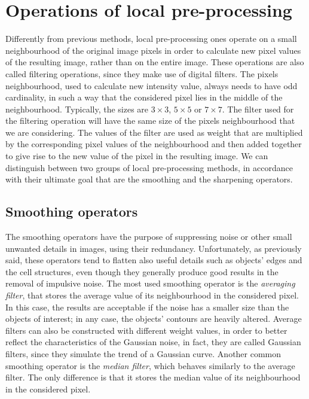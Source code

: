 \documentclass[final,a4paper,12pt,english]{UnicaPhdThesis3}
\begin{document}
	\section{Operations of local pre-processing} %
	Differently from previous methods, local pre-processing ones operate on a small neighbourhood of the original image pixels in order to calculate new pixel values ​​of the resulting image, rather than on the entire image. These operations are also called filtering operations, since they make use of digital filters. The pixels neighbourhood, used to calculate new intensity value, always needs to have odd cardinality, in such a way that the considered pixel lies in the middle of the neighbourhood. Typically, the sizes are $3\times3$, $5\times5$ or $7\times7$. The filter used for the filtering operation will have the same size of the pixels neighbourhood that we are considering. The values of the filter are used as weight that are multiplied by the corresponding pixel values of the neighbourhood and then added together to give rise to the new value of the pixel in the resulting image. We can distinguish between two groups of local pre-processing methods, in accordance with their ultimate goal that are the smoothing and the sharpening operators.
	
	\subsection{Smoothing operators} %
	The smoothing operators have the purpose of suppressing noise or other small unwanted details in images, using their redundancy. Unfortunately, as previously said, these operators tend to flatten also useful details such as objects' edges and the cell structures, even though they generally produce good results in the removal of impulsive noise. The most used smoothing operator is the \textit{averaging filter}, that stores the average value of its neighbourhood in the considered pixel. In this case, the results are acceptable if the noise has a smaller size than the objects of interest; in any case, the objects' contours are heavily altered. Average filters can also be constructed with different weight values, in order to better reflect the characteristics of the Gaussian noise, in fact, they are called Gaussian filters, since they simulate the trend of a Gaussian curve. Another common smoothing operator is the \textit{median filter}, which behaves similarly to the average filter. The only difference is that it stores the median value of its neighbourhood in the considered pixel.
	
\end{document}
